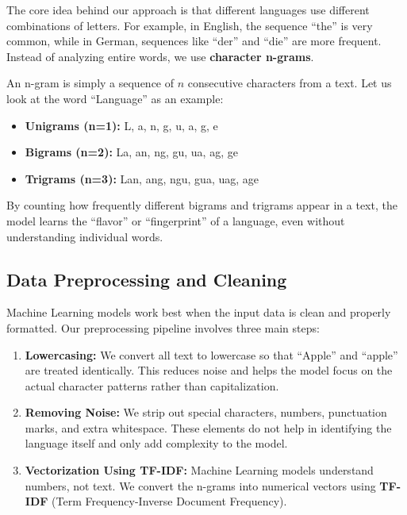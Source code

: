 \documentclass[conference]{IEEEtran}
\begin{document}
The core idea behind our approach is that different languages use different combinations of letters. For example, in English, the sequence ``the'' is very common, while in German, sequences like ``der'' and ``die'' are more frequent. Instead of analyzing entire words, we use \textbf{character n-grams}.

An n-gram is simply a sequence of $n$ consecutive characters from a text. Let us look at the word ``Language'' as an example:

\begin{itemize}
    \item \textbf{Unigrams (n=1):} L, a, n, g, u, a, g, e
    \item \textbf{Bigrams (n=2):} La, an, ng, gu, ua, ag, ge
    \item \textbf{Trigrams (n=3):} Lan, ang, ngu, gua, uag, age
\end{itemize}

By counting how frequently different bigrams and trigrams appear in a text, the model learns the ``flavor'' or ``fingerprint'' of a language, even without understanding individual words.

\subsection{Data Preprocessing and Cleaning}

Machine Learning models work best when the input data is clean and properly formatted. Our preprocessing pipeline involves three main steps:

\begin{enumerate}
    \item \textbf{Lowercasing:} We convert all text to lowercase so that ``Apple'' and ``apple'' are treated identically. This reduces noise and helps the model focus on the actual character patterns rather than capitalization.
    
    \item \textbf{Removing Noise:} We strip out special characters, numbers, punctuation marks, and extra whitespace. These elements do not help in identifying the language itself and only add complexity to the model.
    
    \item \textbf{Vectorization Using TF-IDF:} Machine Learning models understand numbers, not text. We convert the n-grams into numerical vectors using \textbf{TF-IDF} (Term Frequency-Inverse Document Frequency). 
\end{enumerate}
\end{document}
